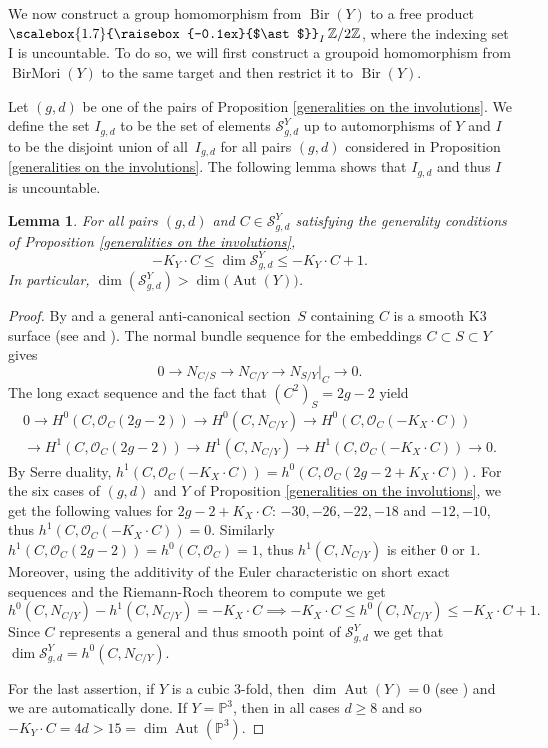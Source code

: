 \documentclass[JEP,XML,SOM,Unicode,published]{cedram}
\theoremstyle{plain}
\newtheorem{lemma}[theorem]{Lemma}
\theoremstyle{definition}
\newcommand\Aut{\operatorname{Aut}}
\newcommand\Bir{\operatorname{Bir}}
\newcommand\BirMori{\operatorname{BirMori}}
\newcommand{\OO}{\mathcal{O}}
\newcommand{\ZZ}{\mathbb{Z}}
\newcommand{\PP}{\mathbb{P}}
\newcommand{\freeprod}{\mathop{\scalebox{1.7}{\raisebox{-0.1ex}{$\ast$}}}}
\begin{document}
We now construct a group homomorphism from $\Bir(Y )$ to a free product $\freeprod_I \ZZ/2\ZZ$, where the indexing set I is uncountable. To do so, we will first construct a groupoid homomorphism from $\BirMori(Y )$ to the same target and then restrict it to $\Bir(Y )$.

Let $(g,d)$ be one of the pairs of Proposition \ref{generalities on the involutions}. We define the set $I_{g,d}$ to be the set of elements $\mathcal{S}^Y_{g,d}$ up to automorphisms of $Y$ and $I$ to be the disjoint union of all~$I_{g,d}$ for all pairs $(g,d)$ considered in Proposition \ref{generalities on the involutions}.
The following lemma shows that $I_{g,d}$ and thus $I$ is uncountable.

\begin{lemma}\label{I is uncountable}
For all pairs $(g,d)$ and $C \in \mathcal{S}^Y_{g,d}$ satisfying the generality conditions of Proposition \ref{generalities on the involutions},
\[
-K_Y\cdot C \leq \dim \mathcal{S}^Y_{g,d} \leq -K_Y\cdot C +1.
\]
In particular, $\dim \left(\mathcal{S}^Y_{g,d}\right) > \dim \bigl(\Aut(Y)\bigr)$.
\end{lemma}

\begin{proof}
By \cite[Prop.\,2.8]{WeakFanos} and \cite[Prop.\,3.7]{WeakFanosCubics} a general anti-canonical section~$S$ containing $C$ is a smooth K3 surface (see \cite[Prop.\,2.8]{WeakFanos} and \cite[Prop.\,2.9]{WeakFanosCubics}). The normal bundle sequence for the embeddings $C \subset S \subset Y$ gives
\[
0 \to N_{C/S} \to N_{C/Y} \to N_{S/Y}|_C \to 0.
\]
The long exact sequence and the fact that $(C^2)_S = 2g-2$ yield
\begin{multline*}
0 \to H^0\left(C,\OO_C(2g-2) \right) \to H^0(C,N_{C/Y}) \to H^0\left(C,\OO_C(-K_X\cdot C) \right) \\
\to H^1\left(C,\OO_C(2g-2) \right) \to H^1(C,N_{C/Y}) \to H^1\left(C,\OO_C(-K_X\cdot C) \right) \to 0.
\end{multline*}
By Serre duality, $h^1\left(C,\OO_C(-K_X\cdot C) \right) = h^0\left(C,\OO_C(2g-2+K_X\cdot C) \right)$.
For the six cases of $(g,d)$ and $Y$ of Proposition \ref{generalities on the involutions}, we get the following values for $2g-2+K_X\cdot C$: $-30,-26,-22,-18$ and $-12,-10$, thus $h^1\left(C,\OO_C(-K_X\cdot C) \right) = 0$.
Similarly $h^1\left(C,\OO_C(2g-2) \right) = h^0\left(C,\OO_C \right) = 1$, thus $h^1(C,N_{C/Y})$ is either $0$ or $1$. Moreover, using the additivity of the Euler characteristic on short exact sequences and the Riemann-Roch theorem to compute we get
\[
h^0(C,N_{C/Y}) - h^1(C,N_{C/Y}) = -K_X\cdot C \implies -K_X\cdot C \leq h^0(C,N_{C/Y}) \leq -K_X\cdot C + 1.
\]
Since $C$ represents a general and thus smooth point of $\mathcal{S}^Y_{g,d}$ we get that $\dim \mathcal{S}^Y_{g,d} =h^0(C,N_{C/Y})$.

For the last assertion, if $Y$ is a cubic $3$-fold, then $\dim\Aut(Y)= 0$ (see \cite{AutosOfHypersurfaces}) and we are automatically done. If $Y = \PP^3$, then in all cases $d\geq 8$ and so $-K_Y\cdot C = 4d > 15 = \dim\Aut(\PP^3)$.
\end{proof}
\end{document}
